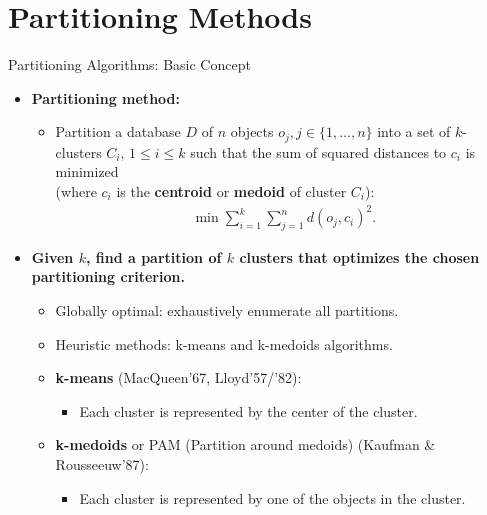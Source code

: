 \section{Partitioning Methods}

\begin{frame}{Partitioning Algorithms: Basic Concept}
	\begin{itemize}
		\item \textbf{Partitioning method:}
		\begin{itemize}
			\item Partition a database $D$ of $n$ objects $o_j, j \in \{1, 
			\ldots, n\}$ into a set of $k$-clusters $C_i$, $1 \leq i \leq k$ 
			such that the sum of squared distances to $c_i$ is minimized \\ 
			(where $c_i$ is the \textbf{\color{airforceblue}centroid} or 
			\textbf{\color{airforceblue}medoid} of cluster $C_i$):
			\begin{align}
				\min \sum_{i=1}^{k} \sum_{j=1}^{n} d(o_j,c_i)^2. 
			\end{align}
		\end{itemize}
		\item \textbf{Given $k$, find a partition of $k$ clusters that 
		optimizes the chosen partitioning criterion.}
		\begin{itemize}
			\item Globally optimal: exhaustively enumerate all partitions.
			\item Heuristic methods: k-means and k-medoids algorithms.
			\item \textbf{\color{airforceblue}k-means} (MacQueen'67, 
			Lloyd'57/'82):
			\begin{itemize}
				\item Each cluster is represented by the center of the cluster.
			\end{itemize}
			\item \textbf{\color{airforceblue}k-medoids} or PAM (Partition 
			around medoids) (Kaufman \& Rousseeuw'87):
			\begin{itemize}
				\item Each cluster is represented by one of the objects in the 
				cluster.
			\end{itemize}
		\end{itemize}
	\end{itemize}
\end{frame}

